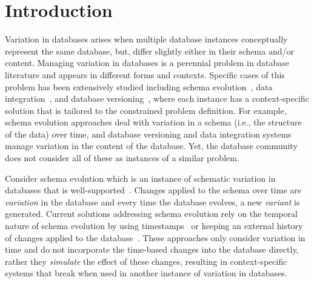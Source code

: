 \section{Introduction}
\label{sec:intro}


\begin{comment}
simple streamline direction:
- variation in db is everywhere
- active research for some instances of it
- other instances aren't well-covered and well-supported
- the combination of instances

a general solution that 
- can model variation for well-covered variation
- others
\end{comment}


Variation in databases arises when multiple database instances 
conceptually represent the same database, but, differ
slightly either in their schema and/or content. 
%
Managing variation in databases is a perennial problem in database literature
and appears in different forms and contexts.
Specific cases of this problem has been extensively studied including 
schema evolution~\cite{SchEvolRA90McKenzie, schVersioning97Castro, 
tempSchEvol91Ariav,prima08Moon}, 
data integration~\cite{dataIntegBook}, 
and database versioning~\cite{datasetVersioning,dbVersioning},
where each instance has a context-specific solution that is tailored
to the constrained problem definition. 
%
For example, schema
evolution approaches deal with variation in a schema (i.e., the structure
of the data) over time, and database versioning and data integration systems 
manage variation in the content of the database. Yet, the database
community does not consider all of these as instances of a similar problem.

Consider schema evolution which is an instance of schematic variation in databases
that is well-supported~\cite{SchEvolRA90McKenzie, 
schVersioning97Castro, tempSchEvol91Ariav, tsql95Snodgrass, 
prima08Moon}.
Changes applied to the schema over time are \emph{variation} 
in the database and every time the database evolves, a new
\emph{variant} is generated.
Current solutions addressing schema
evolution rely on the temporal nature of schema evolution by using
timestamps~\cite{SchEvolRA90McKenzie, schVersioning97Castro, 
tempSchEvol91Ariav, tsql95Snodgrass} 
or keeping an external history of 
changes applied to the database~\cite{prima08Moon}. 
These approaches only consider variation in time and do not
incorporate the time-based changes into
the database directly, rather they \emph{simulate} the effect of these changes,
resulting in context-specific systems that break when used in another instance of
variation in databases. 

